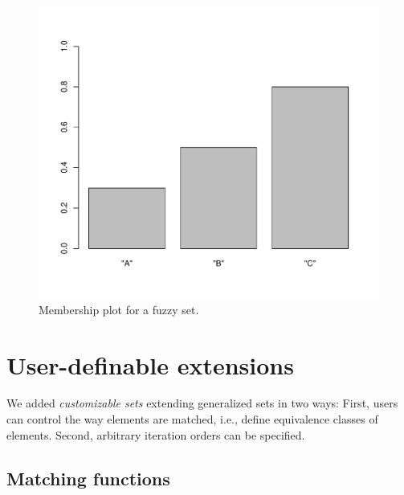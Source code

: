 \documentclass[article]{jss}
\begin{document}
\begin{figure}[h]
\begin{center}
\includegraphics{JSS-020}
\caption{Membership plot for a fuzzy set.}
\label{fig:plot}
\end{center}
\end{figure}

\section{User-definable extensions}
\label{sec:csets}

We added \emph{customizable sets}
extending generalized sets in two ways: First, users
can control the way elements are matched, i.e., define equivalence
classes of elements. Second, arbitrary iteration orders can be specified.

\subsection{Matching functions}
\end{document}
